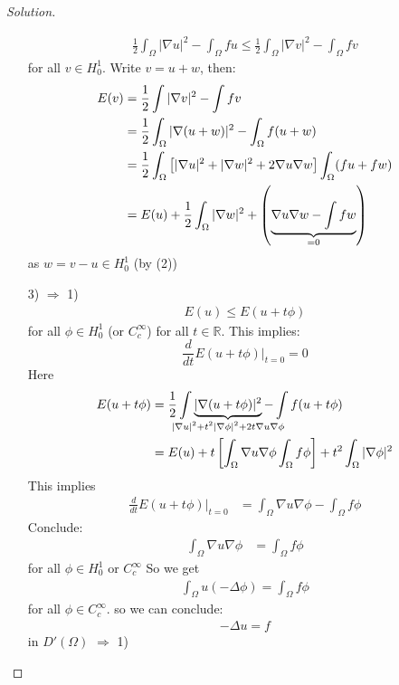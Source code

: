 \documentclass{report}
\theoremstyle{tommy}
\begin{document}
\begin{proof}[Solution]
\begin{itemize}
      \begin{align*}
        \frac{1}{2} \int_\Omega |\nabla u|^2 - \int_\Omega f u \le \frac{1}{2} \int_\Omega |\nabla v|^2 - \int_\Omega f v 
      \end{align*}  
      for all \(v \in H_0^1\). Write \(v = u + w\), then:
      \begin{align*}
        E(v) &= \frac{1}{2} \int |\nabla v|^2 - \int f v \\
        &= \frac{1}{2} \int_\Omega |\nabla (u + w)|^2 - \int_\Omega f (u + w) \\
        &= \frac{1}{2} \int_\Omega \left[|\nabla u|^2 + |\nabla w|^2 + 2 \nabla u \nabla w\right] \int_\Omega(fu + fw)\\
        &= E(u) + \frac{1}{2} \int_\Omega|\nabla w|^2 + \left(\underbrace{\nabla u \nabla w - \int f w}_{\smash{= 0}}\right)
      \end{align*}
      as \(w = v-u \in H_0^1\) (by (2))
      \item[3) \(\Rightarrow\) 1)] 
      \begin{align*}
        E(u) \le E(u + t\phi)
      \end{align*}  
      for all \(\phi \in H_0^1\) (or \(C_c^\infty\)) for all \(t \in \mathbb{R}\). This implies:
      \[\frac{d}{dt} E(u + t \phi)|_{t = 0} = 0\]
      Here 
      \begin{align*}
        E(u + t \phi) &= \frac{1}{2} \int \underbrace{|\nabla ( u + t \phi)|^2}_{\mathclap{|\nabla u|^2 + t^2 |\nabla \phi|^2 + 2 t \nabla u \nabla \phi}} - \int f(u + t \phi) \\
        &= E(u) + t \left[\int_\Omega \nabla u \nabla \phi \int_\Omega f \phi\right] + t^2 \int_\Omega |\nabla \phi|^2
      \end{align*}
      This implies
      \begin{align*}
        \frac{d}{dt} E(u + t \phi)|_{t = 0} &= \int_\Omega \nabla u \nabla \phi - \int_\Omega f \phi
      \end{align*}
      Conclude:
      \begin{align*}
        \int_\Omega \nabla u \nabla \phi &= \int_\Omega f \phi 
      \end{align*}
      for all \(\phi \in H_0^1\) or \(C_c^\infty\) So we get 
      \begin{align*}
        \int_\Omega u (- \Delta \phi) = \int_\Omega f \phi
      \end{align*}
      for all \(\phi \in C_c^\infty\). so we can conclude:
      \begin{align*}
        - \Delta u = f 
      \end{align*}
      in \(D'(\Omega)\) \(\Rightarrow\) 1)
    \end{itemize}
  \end{proof}
\end{document}

